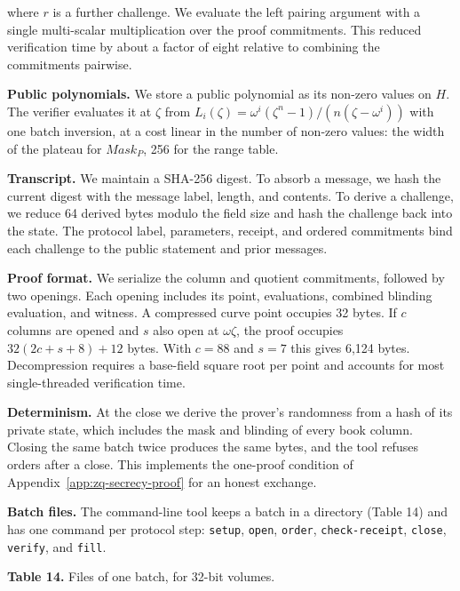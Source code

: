 where \(r\) is a further challenge. We evaluate the left pairing argument with a single multi-scalar multiplication over the proof commitments. This reduced verification time by about a factor of eight relative to combining the commitments pairwise.

\textbf{Public polynomials.} We store a public polynomial as its non-zero values on \(H\). The verifier evaluates it at \(\zeta\) from \(L_i(\zeta) = \omega^i(\zeta^n - 1)/(n(\zeta - \omega^i))\) with one batch inversion, at a cost linear in the number of non-zero values: the width of the plateau for \(Mask_P\), 256 for the range table.

\textbf{Transcript.} We maintain a SHA-256 digest. To absorb a message, we hash the current digest with the message label, length, and contents. To derive a challenge, we reduce 64 derived bytes modulo the field size and hash the challenge back into the state. The protocol label, parameters, receipt, and ordered commitments bind each challenge to the public statement and prior messages.

\textbf{Proof format.} We serialize the column and quotient commitments, followed by two openings. Each opening includes its point, evaluations, combined blinding evaluation, and witness. A compressed curve point occupies 32 bytes. If \(c\) columns are opened and \(s\) also open at \(\omega\zeta\), the proof occupies \(32(2c+s+8)+12\) bytes. With \(c=88\) and \(s=7\) this gives 6,124 bytes. Decompression requires a base-field square root per point and accounts for most single-threaded verification time.

\textbf{Determinism.} At the close we derive the prover's randomness from a hash of its private state, which includes the mask and blinding of every book column. Closing the same batch twice produces the same bytes, and the tool refuses orders after a close. This implements the one-proof condition of Appendix~\ref{app:zq-secrecy-proof} for an honest exchange.

\textbf{Batch files.} The command-line tool keeps a batch in a directory (Table 14) and has one command per protocol step: \texttt{setup}, \texttt{open}, \texttt{order}, \texttt{check-receipt}, \texttt{close}, \texttt{verify}, and \texttt{fill}.

\textbf{Table 14.} Files of one batch, for 32-bit volumes.

